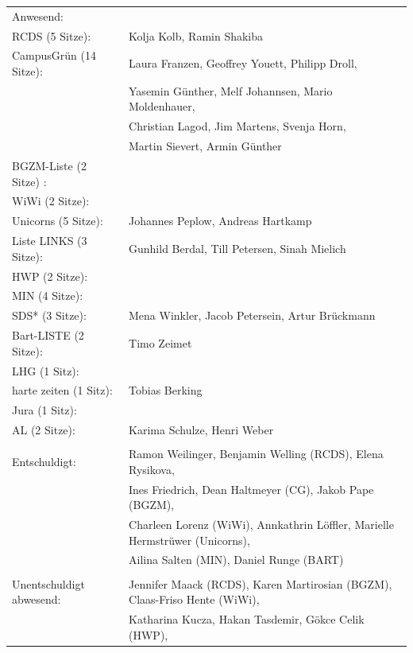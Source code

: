 \documentclass[ngerman,headheight=70pt]{scrartcl}
\begin{document}
    \begin{tabular}{ll}
        Anwesend: & \\
            RCDS (5 Sitze): & Kolja Kolb, Ramin Shakiba \\
             CampusGrün (14 Sitze): & Laura Franzen, Geoffrey Youett, Philipp Droll, \\
                                   & Yasemin Günther, Melf Johannsen, Mario Moldenhauer, \\
                                   & Christian Lagod, Jim Martens, Svenja Horn, \\
                                   & Martin Sievert, Armin Günther \\
             BGZM-Liste (2 Sitze) : & \\
             WiWi (2 Sitze): & \\
             Unicorns (5 Sitze): &  Johannes Peplow, Andreas Hartkamp \\
             Liste LINKS (3 Sitze): & Gunhild Berdal, Till Petersen, Sinah Mielich \\
             HWP (2 Sitze): &  \\
             MIN (4 Sitze): &  \\
             SDS* (3 Sitze): & Mena Winkler, Jacob Petersein, Artur Brückmann \\
             Bart-LISTE (2 Sitze): & Timo Zeimet \\
             LHG (1 Sitz): &  \\
             harte zeiten (1 Sitz): & Tobias Berking \\
             Jura (1 Sitz): & \\
             AL (2 Sitze): & Karima Schulze, Henri Weber \\
            & \\
        Entschuldigt: & Ramon Weilinger, Benjamin Welling (RCDS), Elena Rysikova, \\
                      & Ines Friedrich, Dean Haltmeyer (CG), Jakob Pape (BGZM), \\
                      & Charleen Lorenz (WiWi), Annkathrin Löffler, Marielle Hermstrüwer (Unicorns), \\
                      & Ailina Salten (MIN), Daniel Runge (BART)\\
                      &\\
        Unentschuldigt abwesend: & Jennifer Maack (RCDS), Karen Martirosian (BGZM), Claas-Friso Hente (WiWi), \\
                                & Katharina Kucza, Hakan Tasdemir, Gökce Celik (HWP),\\

\end{tabular}
\end{document}
